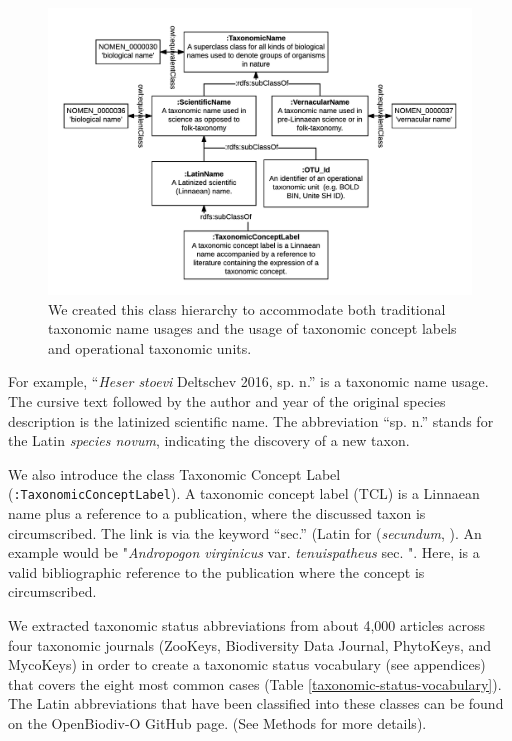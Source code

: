 \begin{figure}[h!]
  \centering
  \includegraphics[width=\textwidth]{Figures/taxonomic-name-class-hierarchy-diagram}
  \decoRule
  \caption[Taxonomic name class hierarchy diagram.]{We created this class hierarchy to accommodate both traditional taxonomic name usages and the usage of taxonomic concept labels and operational taxonomic units.}
  \label{taxonomic-name-class-hierarchy-diagram}
\end{figure}

For example, ``\emph{Heser stoevi} Deltschev 2016, sp. n.'' is a taxonomic name usage. The cursive text followed by the author and year of the original species description is the latinized scientific name. The abbreviation ``sp. n.'' stands for the Latin \emph{species novum}, indicating the discovery of a new taxon.

We also introduce the class Taxonomic Concept Label ({\tt :TaxonomicConceptLabel}). A taxonomic concept label (TCL) is a Linnaean name plus a reference to a publication, where the discussed taxon is circumscribed. The link is via the keyword ``sec.'' (Latin for (\emph{secundum}, \cite{berendsohn_concept_1995}). An example would be "\emph{Andropogon virginicus} var. \emph{tenuispatheus} sec. \cite{blomquist_grasses_1948}". Here, \cite{blomquist_grasses_1948} is a valid bibliographic reference to the publication where the concept is circumscribed.

We extracted taxonomic status abbreviations from about 4,000 articles across four taxonomic journals (ZooKeys, Biodiversity Data Journal, PhytoKeys, and MycoKeys) in order to create a taxonomic status vocabulary (see appendices) that covers the eight most common cases (Table \ref{taxonomic-status-vocabulary}). The Latin abbreviations that have been classified into these classes can be found on the \mbox{OpenBiodiv-O} GitHub page. (See Methods for more details).

